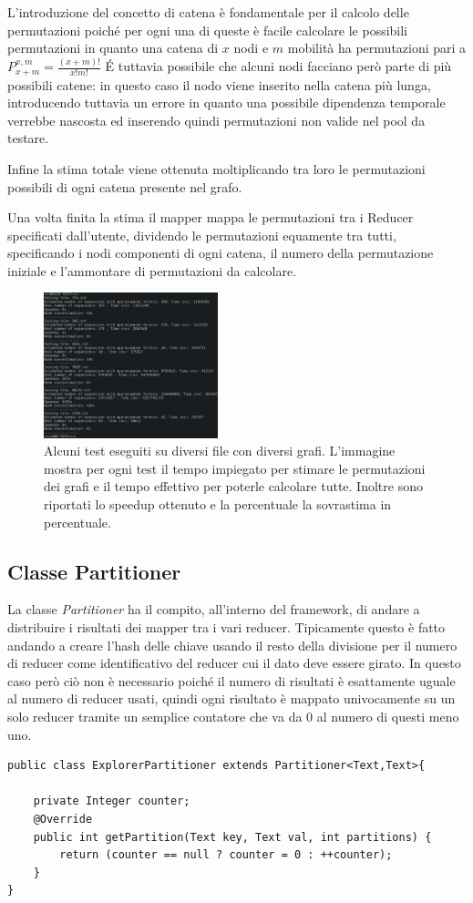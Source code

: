 \documentclass[]{IEEEtran}
\begin{document}
L'introduzione del concetto di catena è fondamentale per il calcolo delle permutazioni poiché per ogni una di queste è facile calcolare le possibili permutazioni in quanto una catena di $x$ nodi e $m$ mobilità ha permutazioni pari a $P_{x+m}^{x,m} = \frac{(x+m)!}{x!m!}$
\'E tuttavia possibile che alcuni nodi facciano però parte di più possibili catene: in questo caso il nodo viene inserito nella catena più lunga, introducendo tuttavia un errore in quanto una possibile dipendenza temporale verrebbe nascosta ed inserendo quindi permutazioni non valide nel pool da testare.

Infine la stima totale viene ottenuta moltiplicando tra loro le permutazioni possibili di ogni catena presente nel grafo.

Una volta finita la stima il mapper mappa le permutazioni tra i Reducer specificati dall'utente, dividendo le permutazioni equamente tra tutti, specificando i nodi componenti di ogni catena, il numero della permutazione iniziale e l'ammontare di permutazioni da calcolare.
\begin{figure}[htp]
	\centering
	\includegraphics[width=0.45\textwidth]{images/tests.png}
	\caption{Alcuni test eseguiti su diversi file con diversi grafi. L'immagine mostra per ogni test il tempo impiegato per stimare le permutazioni dei grafi e il tempo effettivo per poterle calcolare tutte. Inoltre sono riportati lo speedup ottenuto e la percentuale la sovrastima in percentuale.}
\end{figure}

\subsection{Classe Partitioner}
La classe \emph{Partitioner} ha il compito, all'interno del framework, di andare a distribuire i risultati dei mapper tra i vari reducer. Tipicamente questo è fatto andando a creare l'hash delle chiave usando il resto della divisione per il numero di reducer come identificativo del reducer cui il dato deve essere girato. In questo caso però ciò non è necessario poiché il numero di risultati è esattamente uguale al numero di reducer usati, quindi ogni risultato è mappato univocamente su un solo reducer tramite un semplice contatore che va da 0 al numero di questi meno uno.
\begin{lstlisting}[style=javaStyle]
public class ExplorerPartitioner extends Partitioner<Text,Text>{

	private Integer counter;
	@Override
	public int getPartition(Text key, Text val, int partitions) {
		return (counter == null ? counter = 0 : ++counter);
	}
}
\end{lstlisting}
\end{document}
